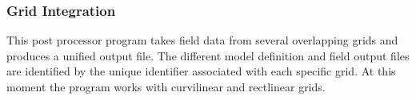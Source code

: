 \vsssub
\subsubsection{Grid Integration} \label{sub:ww3gint}
\vsssub
{}

\vspace{\baselineskip}
\noindent
This post processor program takes field data from several overlapping grids and produces a unified output file. The different model definition and field output files are identified by the unique identifier associated with each specific grid. At this moment the program works with curvilinear and rectlinear grids. 


\pb
